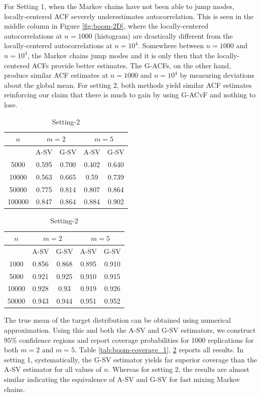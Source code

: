 \documentclass[11pt]{article}
\theoremstyle{remark}
\begin{document}
 For Setting 1, when the Markov chains have not been able to jump modes, locally-centered ACF severely underestimates autocorrelation. This is seen in the middle column in Figure \ref{fig:boom-2D}, where the locally-centered autocorrelations at $n=1000$ (histogram) are drastically different from the locally-centered autocorrelations at $n = 10^4$. Somewhere between $n = 1000$ and $n = 10^4$, the Markov chains jump modes and it is only then that the locally-centered ACFs provide better estimates. The G-ACFs,  on the other hand, produce similar ACF estimates at $n = 1000$ and $n = 10^4$ by measuring deviations about the global mean. For setting 2, both methods yield similar ACF estimates reinforcing our claim that there is much to gain by using G-ACvF and nothing to lose.




\begin{table}[h]
\parbox{.45\linewidth}{
\centering
\small
\begin{tabular}{|c|c|c|c|c|}
\hline
 $n$ & \multicolumn{2}{|c|}{$m = 2$} & \multicolumn{2}{|c|}{$m=5$}\\
 \hline
 & A-SV & G-SV & A-SV & G-SV \\
 \hline
 5000 & 0.595 &  0.700 & 0.402 &  0.640\\
 10000 & 0.563 &  0.665 & 0.59 &  0.739\\
 50000 & 0.775 &  0.814 & 0.807 &  0.864\\
 100000 & 0.847 &  0.864 & 0.884 &  0.902\\
\hline
\end{tabular}
\caption{Setting-1}
\label{tab:boom-coverage_1}
}
\hfill
\parbox{.45\linewidth}{
\centering
\small
\begin{tabular}{|c|c|c|c|c|}
 \hline
 $n$ & \multicolumn{2}{|c|}{$m = 2$} & \multicolumn{2}{|c|}{$m=5$}\\
 \hline
 & A-SV & G-SV & A-SV & G-SV \\
 \hline
 1000 &  0.856 &  0.868 & 0.895 &  0.910\\
 5000 & 0.921 &  0.925 & 0.910 &  0.915\\
 10000 & 0.928 &  0.93 & 0.919 &  0.926\\
 50000 & 0.943 &  0.944 & 0.951 &  0.952\\
\hline
\end{tabular}
\caption{Setting-2}
\label{tab:boom-coverage_2}
}
\end{table}

The true mean of the target distribution can be obtained using numerical approximation. Using this and both the A-SV and G-SV estimators, we construct $95\%$ confidence regions and report coverage probabilities for 1000 replications for both $m=2$ and $m=5$. Table \ref{tab:boom-coverage_1}, \ref{tab:boom-coverage_2} reports all  results. In setting 1, systematically, the G-SV estimator yields far superior coverage than the A-SV estimator for all values of $n$. Whereas for setting 2, the results are almost similar indicating the equivalence of A-SV and G-SV for fast mixing Markov chains.
\end{document}
